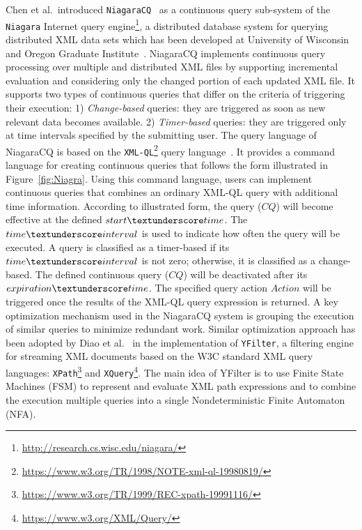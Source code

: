 Chen et al.\ introduced  \texttt{NiagaraCQ}~\cite{chen_et_al_2000} as a continuous query sub-system of the \texttt{Niagara}
Internet query engine\footnote{\url{http://research.cs.wisc.edu/niagara/}},  a distributed database system for querying distributed XML data sets which has been developed at University of Wisconsin and Oregon Graduate Institute~\cite{naughton2001niagara}. NiagaraCQ implements continuous query processing over multiple and distributed XML files by supporting incremental evaluation and considering only the changed portion of each updated XML file. It supports two types of continuous queries that differ on the criteria of triggering their execution:
1) \emph{Change-based}  queries: they are triggered as soon as new relevant data becomes available. 2) \emph{Timer-based}  queries: they are triggered only at time intervals specified by the submitting user. The query language of NiagaraCQ is based on the \texttt{XML-QL}\footnote{\url{https://www.w3.org/TR/1998/NOTE-xml-ql-19980819/}} query language~\cite{deutsch1999query}.
It provides a command language for creating continuous queries that follows the  form illustrated in Figure~\ref{fig:Niagra}. Using this command language, users can implement continuous queries that combines an ordinary XML-QL query with additional time information.
According to illustrated form, the query ($CQ$) will become effective at the defined $start\textunderscore time$. The
$time\textunderscore interval$ is used to indicate how often the query will be executed. A
query is classified as a timer-based if its $time\textunderscore interval$ is not zero; otherwise, it
is classified as a change-based. 
The defined continuous query ($CQ$) will be deactivated after its $expiration\textunderscore time$. The specified query action $Action$ will be triggered once the results of the XML-QL query expression is returned.  A key optimization mechanism used  in the NiagaraCQ system is grouping the execution of similar queries to minimize redundant work.  Similar optimization approach has been adopted by Diao et al.~\cite{diao_et_al_2002} in the implementation of  \texttt{YFilter}, a filtering engine for streaming XML documents based on the W3C standard XML query languages: \texttt{XPath}\footnote{\url{https://www.w3.org/TR/1999/REC-xpath-19991116/}} and \texttt{XQuery}\footnote{\url{https://www.w3.org/XML/Query/}}. The main idea of YFilter is to use Finite State Machines (FSM)  to represent and evaluate XML path expressions and to combine the execution multiple queries into a single Nondeterministic Finite Automaton (NFA). 
